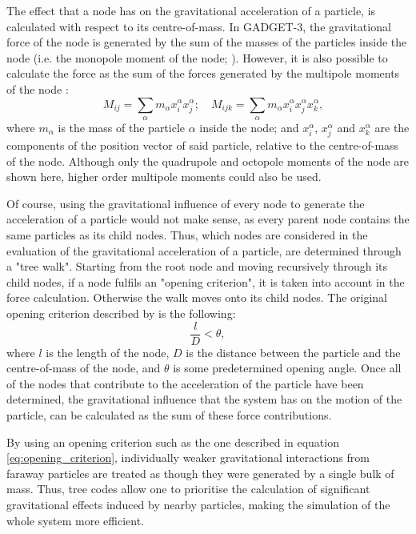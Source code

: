 \documentclass[english, twoside]{HYgradu}
\begin{document}
The effect that a node has on the gravitational acceleration of a particle, is calculated with respect to its centre-of-mass. In GADGET-3, the gravitational force of the node is generated by the sum of the masses of the particles inside the node (i.e. the monopole moment of the node; \citealt{Springel2005}). However, it is also possible to calculate the force as the sum of the forces generated by the multipole moments of the node \citep{BinneyTremaine}:
\begin{equation}
\quad M_{ij} = \displaystyle\sum_\alpha m_\alpha x^\alpha_i x^\alpha_j; \quad M_{ijk} = \displaystyle\sum_\alpha m_\alpha x^\alpha_i x^\alpha_j x^\alpha_k,
\end{equation}
where $m_\alpha$ is the mass of the particle $\alpha$ inside the node; and $x_i^\alpha$, $x_j^\alpha$ and $x_k^\alpha$ are the components of the position vector of said particle, relative to the centre-of-mass of the node. Although only the quadrupole and octopole moments of the node are shown here, higher order multipole moments could also be used.

Of course, using the gravitational influence of every node to generate the acceleration of a particle would not make sense, as every parent node contains the same particles as its child nodes. Thus, which nodes are considered in the evaluation of the gravitational acceleration of a particle, are determined through a "tree walk". Starting from the root node and moving recursively through its child nodes, if a node fulfils an "opening criterion", it is taken into account in the force calculation. Otherwise the walk moves onto its child nodes. The original opening criterion described by \cite{Barnes1986} is the following:
\begin{equation}
\frac{l}{D} < \theta, \label{eq:opening_criterion}
\end{equation}
where $l$ is the length of the node, $D$ is the distance between the particle and the centre-of-mass of the node, and $\theta$ is some predetermined opening angle. Once all of the nodes that contribute to the acceleration of the particle have been determined, the gravitational influence that the system has on the motion of the particle, can be calculated as the sum of these force contributions. 

By using an opening criterion such as the one described in equation \ref{eq:opening_criterion}, individually weaker gravitational interactions from faraway particles are treated as though they were generated by a single bulk of mass. Thus, tree codes allow one to prioritise the calculation of significant gravitational effects induced by nearby particles, making the simulation of the whole system more efficient.
\end{document}
